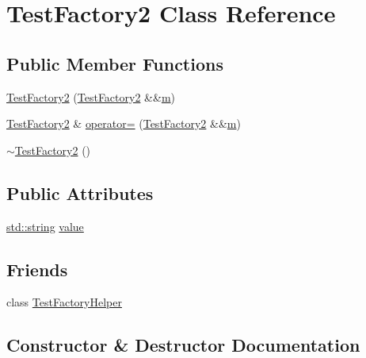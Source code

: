 \hypertarget{class_test_factory2}{}\section{Test\+Factory2 Class Reference}
\label{class_test_factory2}
\subsection*{Public Member Functions}
\begin{DoxyCompactItemize}
\item 
\mbox{\hyperlink{class_test_factory2_a1bb727f520d3639cafe3967103639d36}{Test\+Factory2}} (\mbox{\hyperlink{class_test_factory2}{Test\+Factory2}} \&\&\mbox{\hyperlink{_s_d_l__opengl__glext_8h_af593500c283bf1a787a6f947f503a5c2}{m}})
\item 
\mbox{\hyperlink{class_test_factory2}{Test\+Factory2}} \& \mbox{\hyperlink{class_test_factory2_aaf96187adcc9c464cde58000ffb99bfd}{operator=}} (\mbox{\hyperlink{class_test_factory2}{Test\+Factory2}} \&\&\mbox{\hyperlink{_s_d_l__opengl__glext_8h_af593500c283bf1a787a6f947f503a5c2}{m}})
\item 
\mbox{\hyperlink{class_test_factory2_aaa47ab8c4b77cb65be5fd2441df6ebd4}{$\sim$\+Test\+Factory2}} ()
\end{DoxyCompactItemize}
\subsection*{Public Attributes}
\begin{DoxyCompactItemize}
\item 
\mbox{\hyperlink{_s_d_l__opengl__glext_8h_ab4ccfaa8ab0e1afaae94dc96ef52dde1}{std\+::string}} \mbox{\hyperlink{class_test_factory2_ad84cc2c3de69188fba2d5598ad40faaf}{value}}
\end{DoxyCompactItemize}
\subsection*{Friends}
\begin{DoxyCompactItemize}
\item 
class \mbox{\hyperlink{class_test_factory2_adc15c60543a15213908f8668bd10792b}{Test\+Factory\+Helper}}
\end{DoxyCompactItemize}


\subsection{Constructor \& Destructor Documentation}
\mbox{\label{class_test_factory2_a1bb727f520d3639cafe3967103639d36}} 
